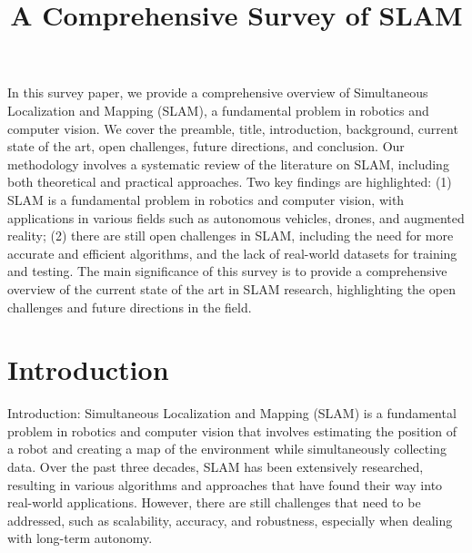 \documentclass[conference]{IEEEtran}
\begin{document}
\title{A Comprehensive Survey of SLAM}
\author{
\and
{}
}

\maketitle

In this survey paper, we provide a comprehensive overview of Simultaneous Localization and Mapping (SLAM), a fundamental problem in robotics and computer vision. We cover the preamble, title, introduction, background, current state of the art, open challenges, future directions, and conclusion. Our methodology involves a systematic review of the literature on SLAM, including both theoretical and practical approaches. Two key findings are highlighted: (1) SLAM is a fundamental problem in robotics and computer vision, with applications in various fields such as autonomous vehicles, drones, and augmented reality; (2) there are still open challenges in SLAM, including the need for more accurate and efficient algorithms, and the lack of real-world datasets for training and testing. The main significance of this survey is to provide a comprehensive overview of the current state of the art in SLAM research, highlighting the open challenges and future directions in the field.

\section{Introduction}
Introduction:
Simultaneous Localization and Mapping (SLAM) is a fundamental problem in robotics and computer vision that involves estimating the position of a robot and creating a map of the environment while simultaneously collecting data. Over the past three decades, SLAM has been extensively researched, resulting in various algorithms and approaches that have found their way into real-world applications. However, there are still challenges that need to be addressed, such as scalability, accuracy, and robustness, especially when dealing with long-term autonomy.
\end{document}
